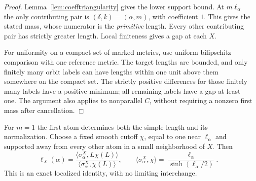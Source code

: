 \documentclass[11pt,a4paper]{article}
\numberwithin{equation}{section}
\theoremstyle{definition}
\theoremstyle{remark}
\begin{document}
\begin{proof}
Lemma~\ref{lem:coefftriangularity} gives the lower support bound.
At $m\ell_\alpha$ the only contributing pair is
$(\delta,k)=(\alpha,m)$, with coefficient $1$. This gives the
stated mass, whose numerator is the \emph{primitive} length.
Every other contributing pair has strictly greater length.
Local finiteness gives a gap at each $X$.

For uniformity on a compact set of marked metrics, use uniform
bilipschitz comparison with one reference metric. The target lengths
are bounded, and only finitely many orbit labels can have lengths
within one unit above them somewhere on the compact set. The
strictly positive differences for those finitely many labels have
a positive minimum; all remaining labels have a gap at least one.
The argument also applies to nonparallel $C$, without requiring a
nonzero first mass after cancellation.
\end{proof}

For $m=1$ the first atom determines both the simple length and its
normalization. Choose a fixed smooth cutoff $\chi$, equal to one
near $\ell_\alpha$ and supported away from every other atom in a
small neighborhood of $X$. Then
\begin{equation}
 \boxed{
 \ell_X(\alpha)
 =\frac{\langle\sigma_\alpha^X,L\chi(L)\rangle}
        {\langle\sigma_\alpha^X,\chi(L)\rangle},\qquad
 \langle\sigma_\alpha^X,\chi\rangle
 =\frac{\ell_\alpha}{\sinh(\ell_\alpha/2)}.
 }
 \label{eq:coeffmomentratio}
\end{equation}
This is an exact localized identity, with no limiting interchange.
\end{document}
